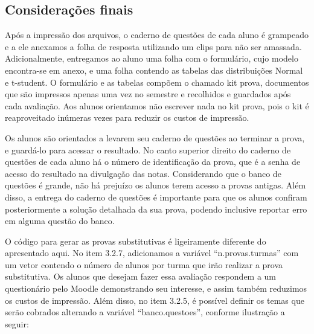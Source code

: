 \documentclass[a4paper]{report}
\begin{document}
\subsection{Considerações finais}

Após a impressão dos arquivos, o caderno de questões de cada aluno é
grampeado e a ele anexamos a folha de resposta utilizando um clips para
não ser amassada. Adicionalmente, entregamos ao aluno uma folha com o
formulário, cujo modelo encontra-se em anexo, e uma folha contendo as
tabelas das distribuições Normal e t-student. O formulário e as tabelas
compõem o chamado kit prova, documentos que são impressos apenas uma vez
no semestre e recolhidos e guardados após cada avaliação. Aos alunos
orientamos não escrever nada no kit prova, pois o kit é reaproveitado
inúmeras vezes para reduzir os custos de impressão.

Os alunos são orientados a levarem seu caderno de questões ao terminar a
prova, e guardá-lo para acessar o resultado. No canto superior direito
do caderno de questões de cada aluno há o número de identificação da
prova, que é a senha de acesso do resultado na divulgação das notas.
Considerando que o banco de questões é grande, não há prejuízo os alunos
terem acesso a provas antigas. Além disso, a entrega do caderno de
questões é importante para que os alunos confiram posteriormente a
solução detalhada da sua prova, podendo inclusive reportar erro em
alguma questão do banco.

O código para gerar as provas substitutivas é ligeiramente diferente do
apresentado aqui. No item 3.2.7, adicionamos a variável
``n.provas.turmas'' com um vetor contendo o número de alunos por turma
que irão realizar a prova substitutiva. Os alunos que desejam fazer essa
avaliação respondem a um questionário pelo Moodle demonstrando seu
interesse, e assim também reduzimos os custos de impressão. Além disso,
no item 3.2.5, é possível definir os temas que serão cobrados alterando
a variável ``banco.questoes'', conforme ilustração a seguir:
\end{document}
